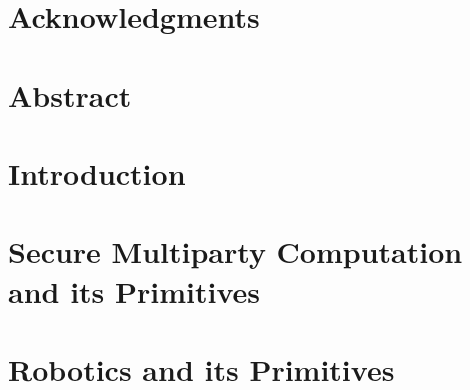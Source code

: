 \documentclass[11pt]{book}
\renewcommand{\baselinestretch}{1.2}
\begin{document}


\newpage
\thispagestyle{empty}
\renewcommand{\thesisdedication}{{\large Copyright \copyright~~SARAT CHANDRA ADDEPALLI, 2009\\}{\large All Rights Reserved\\}}
\thesisdedicationpage



\newpage
\thispagestyle{empty}
\renewcommand{\thesisdedication}{\large To My Parents and Brother}
\thesisdedicationpage

\mastersthesis
\renewcommand{\baselinestretch}{1.5}

\chapter*{Acknowledgments}
\label{ch:ack}


\chapter*{Abstract}
\label{ch:abstract}


\tableofcontents
\listoffigures
\listoftables

\chapter{Introduction}
\label{ch:intro}



\chapter{Secure Multiparty Computation and its Primitives}
\label{ch:chap2}



\chapter{Robotics and its Primitives}
\label{ch:chap3}


\end{document}
